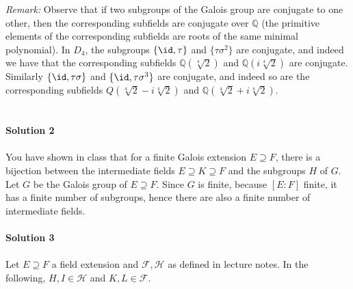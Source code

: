 \documentclass[12pt,a4paper]{article}
\newcommand{\Q}{\mathbb{Q}}
\begin{document}
\textit{Remark:} Observe that if two subgroups of the Galois group are conjugate to one other, then the corresponding subfields are conjugate over $\Q$ (the primitive elements of the corresponding subfields are roots of the same minimal polynomial).  In $D_4$, the subgroups $\{\id, \tau\}$ and  $\{\tau\sigma^2\}$ are conjugate, and indeed we have that the corresponding subfields $\Q(\sqrt[4]{2})$ and $\Q(i\sqrt[4]{2})$ are conjugate. Similarly $ \{\id, \tau\sigma\}$ and $\{\id, \tau\sigma^3\}$ are conjugate, and indeed so are the corresponding subfields $Q(\sqrt[4]{2} -i\sqrt[4]{2})$ and $\Q(\sqrt[4]{2} +i\sqrt[4]{2})$.\\
\\
\\
\textbf{Solution 2} \\
\\
You have shown in class that for a finite Galois extension $E\supseteq F$, there is a bijection between the intermediate fields $E\supseteq K\supseteq F$ and the subgroups $H$ of $G$.  Let $G$ be the Galois group of $E\supseteq F$. Since $G$ is finite, because $[E:F]$ finite, it has a finite number of subgroups, hence there are also a finite number of intermediate fields. 
\\
\\
\textbf{Solution 3}\\
\\
Let $E\supseteq F$ a field extension and $\mathcal{F}, \mathcal{H}$ as defined in lecture notes. In the following, $H,I\in \mathcal{H}$ and $K,L\in \mathcal{F}$. 
\end{document}
